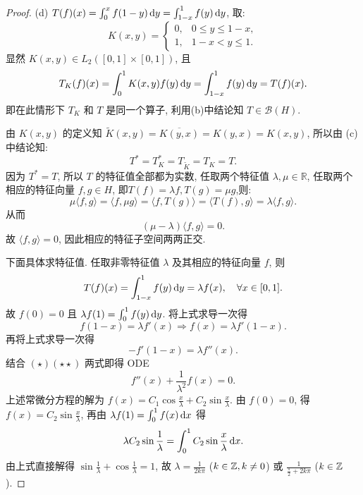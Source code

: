\begin{proof}
    (d) $T(f)(x)=\int_0^x f(1-y)\mathop{}\!\mathrm{d} y=\int_{1-x}^1 f(y)\mathop{}\!\mathrm{d} y$, 取:
    \[K(x,y)=
    \begin{cases}
    0, & 0\leq y\leq 1-x,\\
    1, & 1-x<y\leq 1.
    \end{cases}\]
    显然 $K(x,y)\in L_2([0,1]\times [0,1])$, 且
    \[T_K(f)(x)=\int_0^1 K(x,y)f(y)\mathop{}\!\mathrm{d} y=\int_{1-x}^1 f(y)\mathop{}\!\mathrm{d} y=T(f)(x).\]
    即在此情形下 $T_K$ 和 $T$ 是同一个算子, 利用(b)中结论知 $T\in\mathcal{B}(H)$.

    由 $K(x,y)$ 的定义知 $\widetilde{K}(x,y)=\overline{K(y,x)}=K(y,x)=K(x,y)$, 所以由 (c) 中结论知:
    \[T^{*}=T_K^{*}=T_{\widetilde{K}}=T_K=T.\]
    因为 $T^{*}=T$, 所以 $T$ 的特征值全部都为实数, 
    任取两个特征值 $\lambda,\mu\in\mathbb{R}$, 任取两个相应的特征向量 $f,g\in H$, 
    即$T(f)=\lambda f,T(g)=\mu g$,则:
    \[\mu\langle f,g\rangle=\langle f,\mu g\rangle=\langle f,T(g)\rangle=\langle T(f),g\rangle=\lambda\langle f,g\rangle.\]
    从而
    \[(\mu-\lambda)\langle f,g\rangle=0.\]
    故 $\langle f,g\rangle=0$, 因此相应的特征子空间两两正交.

    下面具体求特征值. 任取非零特征值 $\lambda$ 及其相应的特征向量 $f$, 则
    \[T(f)(x)=\int_{1-x}^1 f(y)\mathop{}\!\mathrm{d} y=\lambda f(x),\quad\forall x\in [0,1].\]
    故 $f(0)=0$ 且 $\lambda f(1)=\int_0^1 f(y)\mathop{}\!\mathrm{d} y$. 将上式求导一次得
    \begin{equation}
        f(1-x)=\lambda f'(x)\Longrightarrow f(x)=\lambda f'(1-x).\tag{$\star$}
    \end{equation}
    再将上式求导一次得
    \begin{equation}
        -f'(1-x)=\lambda f''(x).\tag{$\star\star$}
    \end{equation}
    结合 $(\star)(\star\star)$ 两式即得 ODE
    \[f''(x)+\frac{1}{\lambda^2}f(x)=0.\]
    上述常微分方程的解为 $f(x)=C_1\cos\frac{x}{\lambda}+C_2\sin\frac{x}{\lambda}$.
    由 $f(0)=0$, 得 $f(x)=C_2\sin\frac{x}{\lambda}$, 再由 $\lambda f(1)=\int_0^1 f(x)\mathop{}\!\mathrm{d} x$ 得
    \[\lambda C_2\sin\frac{1}{\lambda}=\int_0^1 C_2\sin\frac{x}{\lambda}\mathop{}\!\mathrm{d} x.\]
    由上式直接解得 $\sin\frac{1}{\lambda}+\cos\frac{1}{\lambda}=1$,
    故 $\lambda=\frac{1}{2k\pi}$ ($k\in\mathbb{Z},k\neq 0$) 或 $\frac{1}{\frac{\pi}{2}+2k\pi}$ ($k\in\mathbb{Z}$).
\end{proof}



